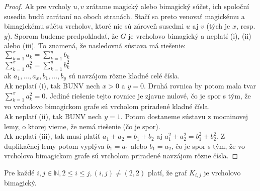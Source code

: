 \begin{proof} Ak pre vrcholy $u,v$ zrátame magický alebo bimagický súčet, ich spoloční susedia budú zarátaní na oboch stranách. Stačí sa preto venovať magickému a bimagickému súčtu vrcholov, ktoré nie sú zároveň susedmi $u$ aj $v$ (tých je $x$, resp. $y$). Sporom budeme predpokladať, že $G$ je vrcholovo bimagický a neplatí (i), (ii) alebo (iii). To znamená, že nasledovná sústava má riešenie: \\
$\sum_{k=1}^{x} a_k = \sum_{k=1}^{y} b_k$ \\
$\sum_{k=1}^{x} a^2_k = \sum_{k=1}^{y} b^2_k$ \\
ak $a_1, ... , a_x, b_1, ... , b_y$ sú navzájom rôzne kladné celé čísla. \\

Ak neplatí (i), tak BUNV nech $x > 0$ a $y = 0$. Druhá rovnica by potom mala tvar $\sum_{k=1}^{x} a^2_k = 0$. Jediné riešenie tejto rovnice je zjavne nulové, čo je spor s tým, že vo vrcholovo bimagickom grafe sú vrcholom priradené kladné čísla.  \\

Ak neplatí (ii), tak BUNV nech $y = 1$. Potom dostaneme sústavu z mocninovej lemy, o ktorej vieme, že nemá riešenie (čo je spor). \\

Ak neplatí (iii), tak musí platiť $a_1 + a_2 = b_1 + b_2$ aj $a^2_1 + a^2_2 = b^2_1 + b^2_2$. Z duplikačnej lemy potom vyplýva $b_1 = a_1$ alebo $b_1 = a_2$,  čo je spor s tým, že vo vrcholovo bimagickom grafe sú vrcholom priradené navzájom rôzne čísla.
\end{proof}

\begin{subtheorem} Pre každé  $i,j \in \mathbb{N}, 2 \leq i \leq j, (i, j) \neq (2, 2)$ platí, že graf $K_{i,j}$ je vrcholovo bimagický.
\end{subtheorem}

